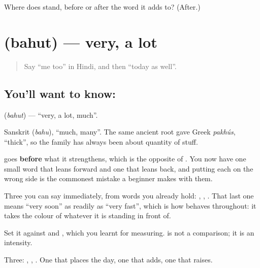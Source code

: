\begin{tcolorbox}[breakable,colback=teal!4,colframe=teal!35!black,title={Before you move on}]
Where does  stand, before or after the word it adds to? (After.)
\end{tcolorbox}
\section[\texorpdfstring{\hi{बहुत} (bahut)}{बहुत (bahut)}]{ (bahut) — very, a lot}

\label{lesson:HI-C71-very}



\begin{quote}
Say \textquotedblleft{}me too\textquotedblright{} in Hindi, and then \textquotedblleft{}today as well\textquotedblright{}.
\end{quote}

\subsection*{You'll want to know: }
\textbf{} (\emph{bahut}) — \textquotedblleft{}very, a lot, much\textquotedblright{}.

Sanskrit  (\emph{bahu}), \textquotedblleft{}much, many\textquotedblright{}. The same ancient root gave Greek \emph{pakhús}, \textquotedblleft{}thick\textquotedblright{}, so the family has always been about quantity of stuff.

 goes \textbf{before} what it strengthens, which is the opposite of . You now have one small word that leans forward and one that leans back, and putting each on the wrong side is the commonest mistake a beginner makes with them.

Three you can say immediately, from words you already hold: \textbf{ }, \textbf{ }, \textbf{ }. That last one means \textquotedblleft{}very soon\textquotedblright{} as readily as \textquotedblleft{}very fast\textquotedblright{}, which is how  behaves throughout: it takes the colour of whatever it is standing in front of.

Set it against \textbf{} and \textbf{}, which you learnt for measuring.  is not a comparison; it is an intensity.

\begin{grammarlens}[title={What you've built}]
Three: , , . One that places the day, one that adds, one that raises.
\end{grammarlens}

